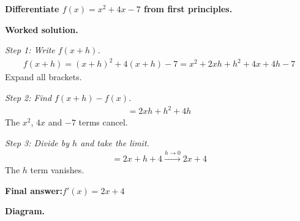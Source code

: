 \documentclass[11pt]{article}
\newcommand{\question}[1]{\par\medskip\noindent\textbf{#1}\par}
\begin{document}
\question{Differentiate \( f(x) = x^2 + 4x - 7 \) from first principles.}

\textbf{Worked solution.}

\textit{Step 1: Write \( f(x+h) \).}
\[\begin{gathered}
f(x+h) = (x+h)^2 + 4(x+h) - 7 = x^2 + 2xh + h^2 + 4x + 4h - 7
\end{gathered}\]
Expand all brackets.

\textit{Step 2: Find \( f(x+h) - f(x) \).}
\[\begin{gathered}
= 2xh + h^2 + 4h
\end{gathered}\]
The \( x^2 \), \( 4x \) and \( -7 \) terms cancel.

\textit{Step 3: Divide by \( h \) and take the limit.}
\[\begin{gathered}
= 2x + h + 4 \xrightarrow{h \to 0} 2x + 4
\end{gathered}\]
The \( h \) term vanishes.

\begin{answerbox}
\textbf{Final answer:}\quad \(\displaystyle  f'(x) = 2x + 4 \)
\end{answerbox}
\textbf{Diagram.}
\end{document}

